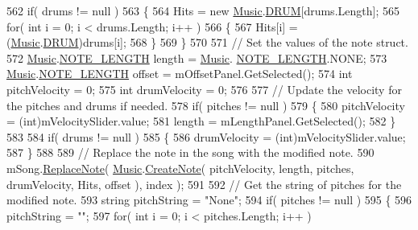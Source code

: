 \begin{DoxyCodeInclude}
562                 \textcolor{keywordflow}{if}( drums != null )
563                 \{
564                     Hits = \textcolor{keyword}{new} \hyperlink{class_music}{Music}.\hyperlink{group___music_enums_gade475b4382c7066d1af13e7c13c029b6}{DRUM}[drums.Length];
565                     \textcolor{keywordflow}{for}( \textcolor{keywordtype}{int} i = 0; i < drums.Length; i++ )
566                     \{
567                         Hits[i] = (\hyperlink{class_music}{Music}.\hyperlink{group___music_enums_gade475b4382c7066d1af13e7c13c029b6}{DRUM})drums[i];
568                     \}
569                 \}
570 
571                 \textcolor{comment}{// Set the values of the note struct.}
572                 \hyperlink{class_music}{Music}.\hyperlink{group___music_enums_gaf11b5f079adbb21c800b9eca1c5c3cbd}{NOTE\_LENGTH} length = \hyperlink{class_music}{Music}.
      \hyperlink{group___music_enums_gaf11b5f079adbb21c800b9eca1c5c3cbd}{NOTE\_LENGTH}.NONE;
573                 \hyperlink{class_music}{Music}.\hyperlink{group___music_enums_gaf11b5f079adbb21c800b9eca1c5c3cbd}{NOTE\_LENGTH} offset = mOffsetPanel.GetSelected();
574                 \textcolor{keywordtype}{int} pitchVelocity = 0;
575                 \textcolor{keywordtype}{int} drumVelocity = 0;
576 
577                 \textcolor{comment}{// Update the velocity for the pitches and drums if needed.}
578                 \textcolor{keywordflow}{if}( pitches != null )
579                 \{
580                     pitchVelocity = (int)mVelocitySlider.value;
581                     length = mLengthPanel.GetSelected();
582                 \}
583 
584                 \textcolor{keywordflow}{if}( drums != null )
585                 \{
586                     drumVelocity = (int)mVelocitySlider.value;
587                 \}
588 
589                 \textcolor{comment}{// Replace the note in the song with the modified note.}
590                 mSong.\hyperlink{group___song_pub_func_ga326d61c75339080057a02c6decb0cde3}{ReplaceNote}( \hyperlink{class_music}{Music}.\hyperlink{group___music_stat_func_gaaf74885e43eb623f64f961985fadcd08}{CreateNote}( pitchVelocity, length, 
      pitches, drumVelocity, Hits, offset ), index );
591 
592                 \textcolor{comment}{// Get the string of pitches for the modified note.}
593                 \textcolor{keywordtype}{string} pitchString = \textcolor{stringliteral}{"None"};
594                 \textcolor{keywordflow}{if}( pitches != null )
595                 \{
596                     pitchString = \textcolor{stringliteral}{""};
597                     \textcolor{keywordflow}{for}( \textcolor{keywordtype}{int} i = 0; i < pitches.Length; i++ )

\end{DoxyCodeInclude}
